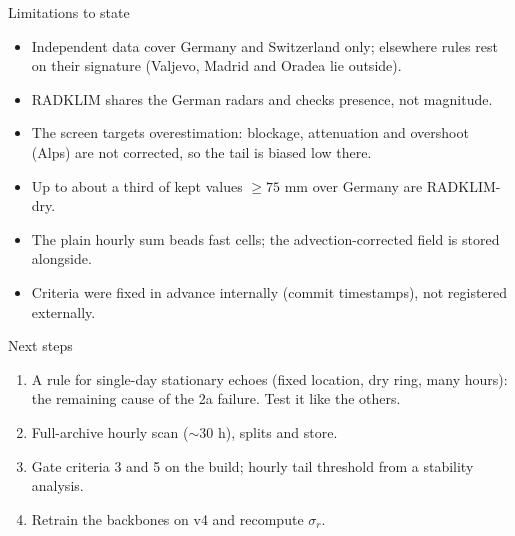 \documentclass[aspectratio=169,10pt]{beamer}
\begin{document}
\begin{frame}{Limitations to state}
  \small
  \begin{itemize}
    \item Independent data cover Germany and Switzerland only; elsewhere rules rest on their
      signature (Valjevo, Madrid and Oradea lie outside).
    \item RADKLIM shares the German radars and checks presence, not magnitude.
    \item The screen targets overestimation: blockage, attenuation and overshoot (Alps) are not
      corrected, so the tail is biased low there.
    \item Up to about a third of kept values $\ge 75$ mm over Germany are RADKLIM-dry.
    \item The plain hourly sum beads fast cells; the advection-corrected field is stored alongside.
    \item Criteria were fixed in advance internally (commit timestamps), not registered externally.
  \end{itemize}
\end{frame}

\begin{frame}{Next steps}
  \small
  \begin{enumerate}
    \item A rule for single-day stationary echoes (fixed location, dry ring, many hours): the
      remaining cause of the 2a failure. Test it like the others.
    \item Full-archive hourly scan ($\sim 30$ h), splits and store.
    \item Gate criteria 3 and 5 on the build; hourly tail threshold from a stability analysis.
    \item Retrain the backbones on v4 and recompute $\sigma_r$.
  \end{enumerate}
\end{frame}
\end{document}
